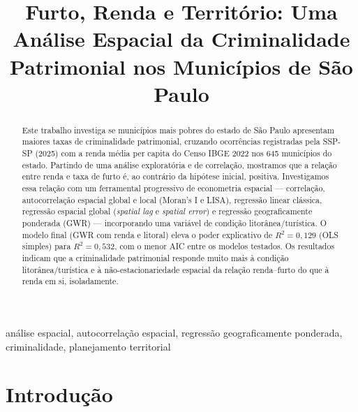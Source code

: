 \documentclass[conference]{IEEEtran}
\begin{document}
\title{Furto, Renda e Território: Uma Análise Espacial da Criminalidade\\
Patrimonial nos Municípios de São Paulo}

\author{
}

\maketitle

\begin{abstract}
Este trabalho investiga se municípios mais pobres do estado de São Paulo
apresentam maiores taxas de criminalidade patrimonial, cruzando ocorrências
registradas pela SSP-SP (2025) com a renda média per capita do Censo IBGE 2022
nos 645 municípios do estado. Partindo de uma análise exploratória e de
correlação, mostramos que a relação entre renda e taxa de furto é, ao
contrário da hipótese inicial, positiva. Investigamos essa relação com um
ferramental progressivo de econometria espacial --- correlação,
autocorrelação espacial global e local (Moran's I e LISA), regressão linear
clássica, regressão espacial global (\textit{spatial lag} e \textit{spatial
error}) e regressão geograficamente ponderada (GWR) --- incorporando uma
variável de condição litorânea/turística. O modelo final (GWR com renda e
litoral) eleva o poder explicativo de $R^2=0{,}129$ (OLS simples) para
$R^2=0{,}532$, com o menor AIC entre os modelos testados. Os resultados
indicam que a criminalidade patrimonial responde muito mais à condição
litorânea/turística e à não-estacionariedade espacial da relação
renda--furto do que à renda em si, isoladamente.
\end{abstract}

\begin{IEEEkeywords}
análise espacial, autocorrelação espacial, regressão geograficamente
ponderada, criminalidade, planejamento territorial
\end{IEEEkeywords}

\section{Introdução}
\end{document}
